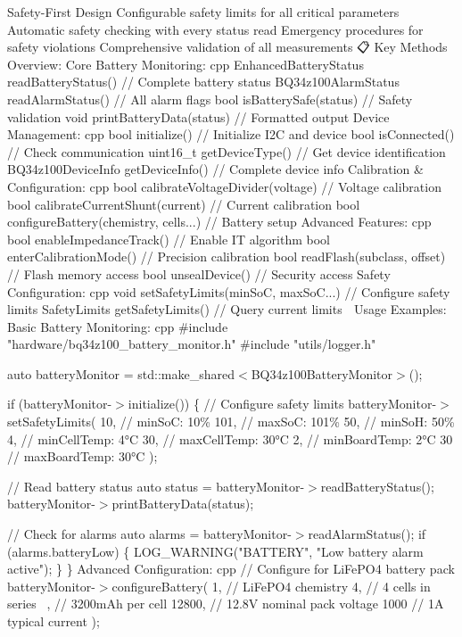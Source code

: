 \begin{DoxyEnumerate}
\item Safety-\/\+First Design Configurable safety limits for all critical parameters Automatic safety checking with every status read Emergency procedures for safety violations Comprehensive validation of all measurements 📋 Key Methods Overview\+: Core Battery Monitoring\+: cpp Enhanced\+Battery\+Status read\+Battery\+Status() // Complete battery status BQ34z100\+Alarm\+Status read\+Alarm\+Status() // All alarm flags bool is\+Battery\+Safe(status) // Safety validation void print\+Battery\+Data(status) // Formatted output Device Management\+: cpp bool initialize() // Initialize I2C and device bool is\+Connected() // Check communication uint16\+\_\+t get\+Device\+Type() // Get device identification BQ34z100\+Device\+Info get\+Device\+Info() // Complete device info Calibration \& Configuration\+: cpp bool calibrate\+Voltage\+Divider(voltage) // Voltage calibration bool calibrate\+Current\+Shunt(current) // Current calibration bool configure\+Battery(chemistry, cells...) // Battery setup Advanced Features\+: cpp bool enable\+Impedance\+Track() // Enable IT algorithm bool enter\+Calibration\+Mode() // Precision calibration bool read\+Flash(subclass, offset) // Flash memory access bool unseal\+Device() // Security access Safety Configuration\+: cpp void set\+Safety\+Limits(min\+So\+C, max\+So\+C...) // Configure safety limits Safety\+Limits get\+Safety\+Limits() // Query current limits 🎯 Usage Examples\+: Basic Battery Monitoring\+: cpp \#include "{}hardware/bq34z100\+\_\+battery\+\_\+monitor.\+h"{} \#include "{}utils/logger.\+h"{}
\end{DoxyEnumerate}

auto battery\+Monitor = std\+::make\+\_\+shared$<$\+BQ34z100\+Battery\+Monitor$>$();

if (battery\+Monitor-\/\texorpdfstring{$>$}{>}initialize()) \{ // Configure safety limits battery\+Monitor-\/\texorpdfstring{$>$}{>}set\+Safety\+Limits( 10, // min\+SoC\+: 10\% 101, // max\+SoC\+: 101\% 50, // min\+SoH\+: 50\% 4, // min\+Cell\+Temp\+: 4°C 30, // max\+Cell\+Temp\+: 30°C 2, // min\+Board\+Temp\+: 2°C 30 // max\+Board\+Temp\+: 30°C );

// Read battery status auto status = battery\+Monitor-\/\texorpdfstring{$>$}{>}read\+Battery\+Status(); battery\+Monitor-\/\texorpdfstring{$>$}{>}print\+Battery\+Data(status);

// Check for alarms auto alarms = battery\+Monitor-\/\texorpdfstring{$>$}{>}read\+Alarm\+Status(); if (alarms.\+battery\+Low) \{ LOG\+\_\+\+WARNING("{}\+BATTERY"{}, "{}\+Low battery alarm active"{}); \} \} Advanced Configuration\+: cpp // Configure for Li\+Fe\+PO4 battery pack battery\+Monitor-\/\texorpdfstring{$>$}{>}configure\+Battery( 1, // Li\+Fe\+PO4 chemistry 4, // 4 cells in series ~, // 3200m\+Ah per cell 12800, // 12.\+8V nominal pack voltage 1000 // 1A typical current );

